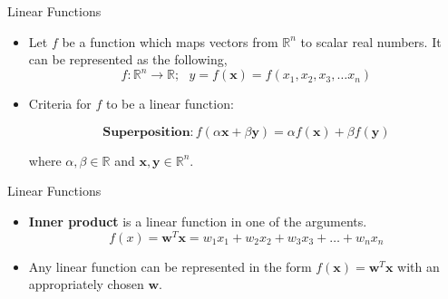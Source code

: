 \documentclass[aspectratio=169]{beamer}
\let\olditem\item
\renewcommand{\item}{\setlength{\itemsep}{\fill}\olditem}
\begin{document}
\begin{frame}[t]{Linear Functions}
\begin{itemize}
\item Let $f$ be a function which maps vectors from $\mathbb{R}^n$ to scalar real numbers. It can be represented as the following,
$$f: \mathbb{R}^n \longrightarrow \mathbb{R}; \,\,\,\, y = f(\mathbf{x}) = f\left(x_1, x_2, x_3, \ldots x_n\right)$$

\item Criteria for $f$ to be a linear function:

$$ \textbf{Superposition}: f\left(\alpha \mathbf{x} + \beta \mathbf{y}\right) = \alpha f\left(\mathbf{x}\right) + \beta f\left(\mathbf{y}\right) $$

where $\alpha, \beta \in \mathbb{R}$ and $\mathbf{x}, \mathbf{y} \in \mathbb{R}^n$.
\end{itemize}
\end{frame}



\begin{frame}[t]{Linear Functions}
\begin{itemize}
\item \textbf{Inner product} is a linear function in one of the arguments. $$f\left(x\right) = \mathbf{w}^T\mathbf{x} = w_1x_1 + w_2x_2 + w_3x_3 + \ldots + w_nx_n$$
\item Any linear function can be represented in the form $f\left(\mathbf{x}\right) = \mathbf{w}^T\mathbf{x}$ with an appropriately chosen $\mathbf{w}$.
\end{itemize}
\end{frame}
\end{document}
